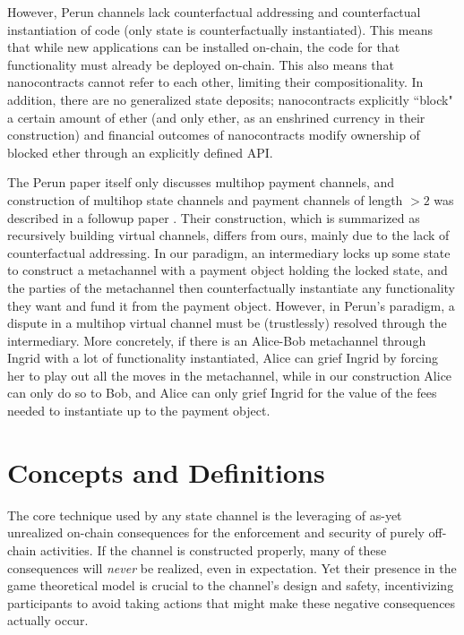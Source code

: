 \documentclass[prb,floatfix,reprint,nofootinbib,amsmath,amssymb,epsfig,pre,floats,letterpaper,groupedaffiliation,tightenlines,allcolors=blue,11pt]{revtex4}
\theoremstyle{definition}
\theoremstyle{definition}
\theoremstyle{definition}
\begin{document}
However, Perun channels lack counterfactual addressing and counterfactual instantiation of code (only state is counterfactually instantiated). This means that while new applications can be installed on-chain, the code for that functionality must already be deployed on-chain. This also means that nanocontracts cannot refer to each other, limiting their compositionality. In addition, there are no generalized state deposits; nanocontracts explicitly ``block" a certain amount of ether (and only ether, as an enshrined currency in their construction) and financial outcomes of nanocontracts modify ownership of blocked ether through an explicitly defined API.

The Perun paper itself only discusses multihop payment channels, and construction of multihop state channels and payment channels of length $> 2$ was described in a followup paper \cite{perun2}. Their construction, which is summarized as recursively building virtual channels, differs from ours, mainly due to the lack of counterfactual addressing. In our paradigm, an intermediary locks up some state to construct a metachannel with a payment object holding the locked state, and the parties of the metachannel then counterfactually instantiate any functionality they want and fund it from the payment object. However, in Perun's paradigm, a dispute in a multihop virtual channel must be (trustlessly) resolved through the intermediary. More concretely, if there is an Alice-Bob metachannel through Ingrid with a lot of functionality instantiated, Alice can grief Ingrid by forcing her to play out all the moves in the metachannel, while in our construction Alice can only do so to Bob, and Alice can only grief Ingrid for the value of the fees needed to instantiate up to the payment object.

\section{Concepts and Definitions}

The core technique used by any state channel is the leveraging of as-yet unrealized on-chain consequences for the enforcement and security of purely off-chain activities. If the channel is constructed properly, many of these consequences will \textit{never} be realized, even in expectation. Yet their presence in the game theoretical model is crucial to the channel's design and safety, incentivizing participants to avoid taking actions that might make these negative consequences actually occur.
\end{document}
